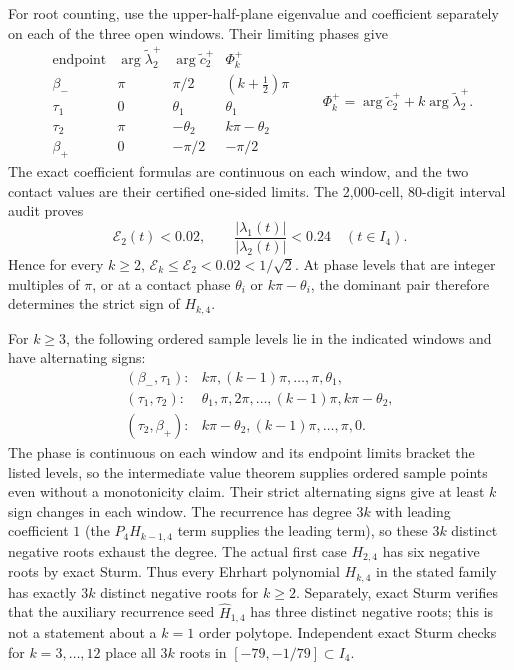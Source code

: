 \documentclass[11pt]{article}
\begin{document}
For root counting, use the upper-half-plane eigenvalue and coefficient
separately on each of the three open windows. Their limiting phases give
\[
\begin{array}{c|c|c|c}
 \text{endpoint}&\arg\widetilde\lambda_2^+
 &\arg\widetilde c_2^+&\Phi_k^+\\ \hline
 \beta_-&\pi&\pi/2&(k+\tfrac12)\pi\\
 \tau_1&0&\theta_1&\theta_1\\
 \tau_2&\pi&-\theta_2&k\pi-\theta_2\\
 \beta_+&0&-\pi/2&-\pi/2
\end{array}
\qquad
\Phi_k^+=\arg\widetilde c_2^+
                 +k\arg\widetilde\lambda_2^+.
\]
The exact coefficient formulas are continuous on each window, and the
two contact values are their certified one-sided limits. The
2,000-cell, 80-digit interval audit proves
\[
 \mathcal E_2(t)<0.02,\qquad
 \frac{|\lambda_1(t)|}{|\lambda_2(t)|}<0.24
 \quad(t\in I_4).
\]
Hence for every $k\geq2$,
$\mathcal E_k\leq\mathcal E_2<0.02<1/\sqrt2$. At phase levels that
are integer multiples of $\pi$, or at a contact phase $\theta_i$ or
$k\pi-\theta_i$, the dominant pair therefore determines the strict
sign of $H_{k,4}$.

For $k\geq3$, the following ordered sample levels lie in the indicated
windows and have alternating signs:
\[
\begin{array}{ll}
(\beta_-,\tau_1):&
 k\pi,(k-1)\pi,\ldots,\pi,\theta_1,\\
(\tau_1,\tau_2):&
 \theta_1,\pi,2\pi,\ldots,(k-1)\pi,k\pi-\theta_2,\\
(\tau_2,\beta_+):&
 k\pi-\theta_2,(k-1)\pi,\ldots,\pi,0.
\end{array}
\]
The phase is continuous on each window and its endpoint limits bracket
the listed levels, so the intermediate value theorem supplies ordered
sample points even without a monotonicity claim. Their strict
alternating signs give at least $k$ sign changes in each window.
The recurrence has degree $3k$ with leading coefficient $1$ (the
$P_4H_{k-1,4}$ term supplies the leading term), so these $3k$ distinct
negative roots exhaust the degree. The actual first case $H_{2,4}$ has
six negative roots by exact Sturm. Thus every Ehrhart polynomial
$H_{k,4}$ in the stated family has exactly $3k$ distinct negative roots
for $k\geq2$. Separately, exact Sturm verifies that the auxiliary
recurrence seed $\widehat H_{1,4}$ has three distinct negative roots;
this is not a statement about a $k=1$ order polytope.
Independent exact Sturm checks for $k=3,\ldots,12$ place all $3k$ roots
in $[-79,-1/79]\subset I_4$.
\end{document}
